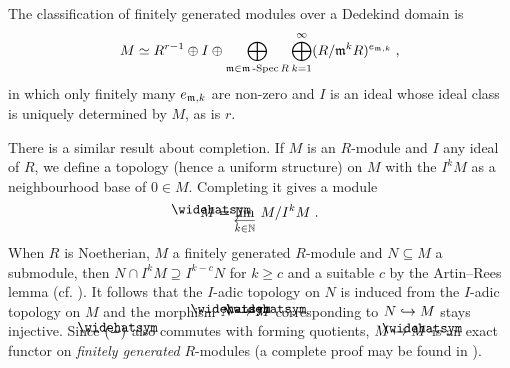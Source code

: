 \documentclass[a4paper,parskip=half,numbers=enddot, DIV=12]{scrreprt}
\begin{document}
\begin{rem*}
	The classification of finitely generated modules over a Dedekind domain is
	\begin{align*}
		M\simeq R^{r-1}\oplus I\oplus \bigoplus_{\mathfrak{m}\in\mathfrak{m}\operatorname{-Spec} R}\bigoplus_{k=1}^\infty (R/\mathfrak{m}^kR)^{e_{\mathfrak{m},k}}\;,
	\end{align*}
	in which only finitely many $e_{\mathfrak{m},k}$ are non-zero and $I$ is an ideal whose ideal class is uniquely determined by $M$, as is $r$.
\end{rem*}
	
There is a similar result about completion. If $M$ is an $R$-module and $I$ any ideal of $R$, we define a topology (hence a uniform structure) on $M$ with the $I^kM$ as a neighbourhood base of $0\in M$. Completing it gives a module 
\begin{align*}
	\roof{M}=\limit[k\in\IN] M/I^kM\;. 
\end{align*}
When $R$ is Noetherian, $M$ a finitely generated $R$-module and $N\subseteq M$ a submodule, then $N\cap I^kM\supseteq I^{k-c}N$ for $k\geq c$ and a suitable $c$ by the Artin--Rees lemma (cf. \cite[Proposition~3.4.1]{alg2}). It follows that the $I$-adic topology on $N$ is induced from the $I$-adic topology on $M$ and the morphism $\roof{N}\morphism\roof{M}$ corresponding to $N\monomorphism M$ stays injective. Since $\roof{(-)}$ also commutes with forming quotients, $M\mapsto\roof{M}$ is an exact functor on \emph{finitely generated} $R$-modules (a complete proof may be found in \cite[Lemma~7.15]{eisenbudCommAlg}). 
\end{document}
